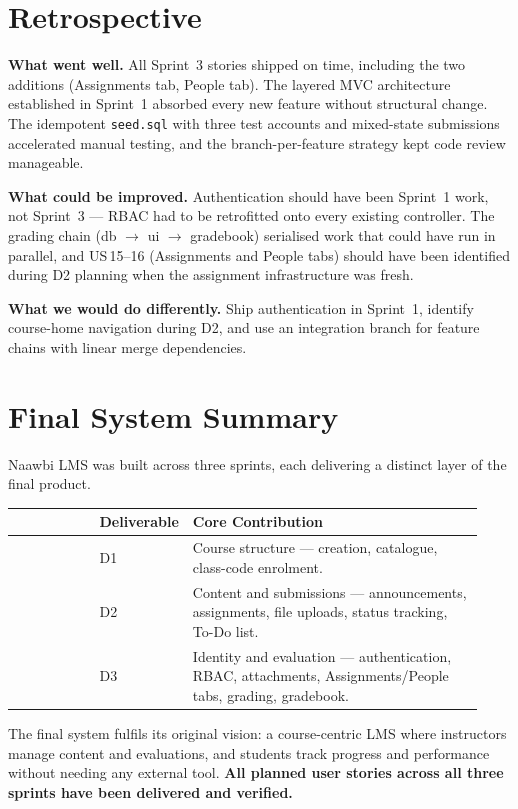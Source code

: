 \documentclass[12pt, a4paper]{article}
\newcommand{\fcol}[1]{\textbf{\color{primary}{#1}}}
\begin{document}
\section{Retrospective}

\textbf{What went well.} All Sprint~3 stories shipped on time, including the
two additions (Assignments tab, People tab). The layered MVC architecture
established in Sprint~1 absorbed every new feature without structural change.
The idempotent \texttt{seed.sql} with three test accounts and mixed-state
submissions accelerated manual testing, and the branch-per-feature strategy
kept code review manageable.

\textbf{What could be improved.} Authentication should have been Sprint~1
work, not Sprint~3 --- RBAC had to be retrofitted onto every existing
controller. The grading chain (db $\rightarrow$ ui $\rightarrow$ gradebook)
serialised work that could have run in parallel, and US\,15--16 (Assignments
and People tabs) should have been identified during D2 planning when the
assignment infrastructure was fresh.

\textbf{What we would do differently.} Ship authentication in Sprint~1,
identify course-home navigation during D2, and use an integration branch for
feature chains with linear merge dependencies.

\section{Final System Summary}

Naawbi LMS was built across three sprints, each delivering a distinct layer
of the final product.

\begin{center}
\begin{tabular}{@{}p{0.18\linewidth}p{0.13\linewidth}p{0.62\linewidth}@{}}
  \toprule
  \fcol{Sprint} & Deliverable & Core Contribution \\
  \midrule
  \fcol{Sprint 1} & D1 & Course structure --- creation, catalogue, class-code enrolment. \\
  \fcol{Sprint 2} & D2 & Content and submissions --- announcements, assignments, file uploads, status tracking, To-Do list. \\
  \fcol{Sprint 3} & D3 & Identity and evaluation --- authentication, RBAC, attachments, Assignments/People tabs, grading, gradebook. \\
  \bottomrule
\end{tabular}
\end{center}

\noindent The final system fulfils its original vision: a course-centric LMS
where instructors manage content and evaluations, and students track progress
and performance without needing any external tool. \textbf{All planned user
stories across all three sprints have been delivered and verified.}
\end{document}
